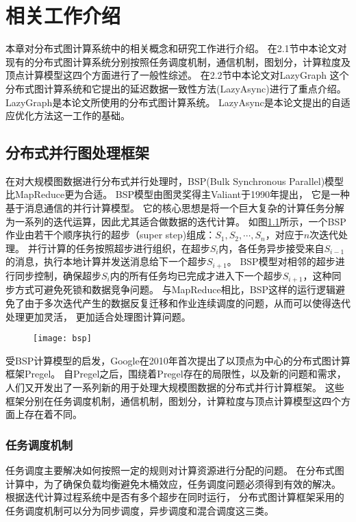 \chapter{相关工作介绍}
本章对分布式图计算系统中的相关概念和研究工作进行介绍。
在2.1节中本论文对现有的分布式图计算系统分别按照任务调度机制，通信机制，图划分，计算粒度及顶点计算模型这四个方面进行了一般性综述。
在2.2节中本论文对LazyGraph 这个分布式图计算系统和它提出的延迟数据一致性方法(LazyAsync)进行了重点介绍。
LazyGraph是本论文所使用的分布式图计算系统。
LazyAsync是本论文提出的自适应优化方法这一工作的基础。
\section{分布式并行图处理框架}
在对大规模图数据进行分布式并行处理时，BSP(Bulk Synchronous Parallel)模型\cite{bsp@1990}比MapReduce更为合适。
BSP模型由图灵奖得主Valiant于1990年提出，
它是一种基于消息通信的并行计算模型。
它的核心思想是将一个巨大复杂的计算任务分解为一系列的迭代运算，因此尤其适合做数据的迭代计算。
如图\ref{fig:bsp}所示，一个BSP作业由若干个顺序执行的超步（super step)组成：$S_1,S_2,\cdots,S_n$，对应于$n$次迭代处理。
并行计算的任务按照超步进行组织，在超步$S_i$内，各任务异步接受来自$S_{i-1}$的消息，执行本地计算并发送消息给下一个超步$S_{i+1}$。
BSP模型对相邻的超步进行同步控制，确保超步$S_i$内的所有任务均已完成才进入下一个超步$S_{i+1}$，这种同步方式可避免死锁和数据竞争问题。
与MapReduce相比，BSP这样的运行逻辑避免了由于多次迭代产生的数据反复迁移和作业连续调度的问题，从而可以使得迭代处理更加灵活，
更加适合处理图计算问题。
\begin{figure}[!htbp]
  \centering
  \texttt{[image: bsp]}
  \label{fig:bsp}
\end{figure}

受BSP计算模型的启发，Google在2010年首次提出了以顶点为中心的分布式图计算框架Pregel\cite{Malewicz@SIGMOD10}。
自Pregel之后，围绕着Pregel存在的局限性，以及新的问题和需求，人们又开发出了一系列新的用于处理大规模图数据的分布式并行计算框架。
这些框架分别在任务调度机制，通信机制，图划分，计算粒度与顶点计算模型这四个方面上存在着不同\cite{TLV, reviewruc}。

\subsection{任务调度机制}
任务调度主要解决如何按照一定的规则对计算资源进行分配的问题。
在分布式图计算中，为了确保负载均衡避免木桶效应，任务调度问题必须得到有效的解决。
根据迭代计算过程系统中是否有多个超步在同时运行，
分布式图计算框架采用的任务调度机制可以分为同步调度，异步调度和混合调度这三类。

